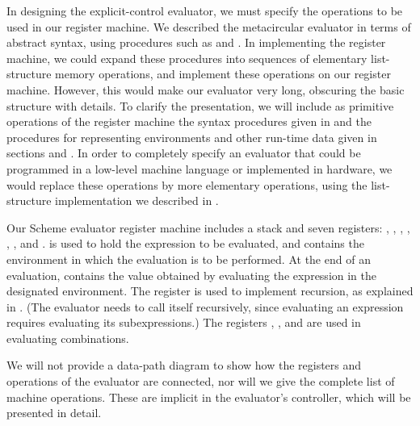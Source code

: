 In designing the explicit-control evaluator, we must specify the operations to be used in our register machine.
We described the metacircular evaluator in terms of abstract syntax, using procedures such as  and .
In implementing the register machine, we could expand these procedures into sequences of elementary list-structure memory operations, and implement these operations on our register machine.
However, this would make our evaluator very long, obscuring the basic structure with details.
To clarify the presentation, we will include as primitive operations of the register machine the syntax procedures given in  and the procedures for representing environments and other run-time data given in sections  and .
In order to completely specify an evaluator that could be programmed in a low-level machine language or implemented in hardware, we would replace these operations by more elementary operations, using the list-structure implementation we described in .

Our Scheme evaluator register machine includes a stack and seven registers:
, , , , , , and .
 is used to hold the expression to be evaluated, and  contains the environment in which the evaluation is to be performed.
At the end of an evaluation,  contains the value obtained by evaluating the expression in the designated environment.
The  register is used to implement recursion, as explained in .
(The evaluator needs to call itself recursively, since evaluating an expression requires evaluating its subexpressions.)
The registers , , and  are used in evaluating combinations.

We will not provide a data-path diagram to show how the registers and operations of the evaluator are connected, nor will we give the complete list of machine operations.
These are implicit in the evaluator’s controller, which will be presented in detail.





